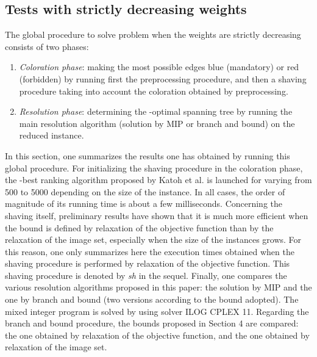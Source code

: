 \documentclass[final,3p,times]{elsarticle}
\begin{document}
\subsection{Tests with strictly decreasing weights}

The global procedure to solve problem  when the
weights are strictly decreasing consists of two phases: 
\begin{enumerate}
\item \emph{Coloration phase}: making the most possible edges blue (mandatory) or
  red (forbidden) by running first the preprocessing procedure, and then a shaving procedure taking into account the coloration obtained by preprocessing. 
\item \emph{Resolution phase}: determining the -optimal spanning
  tree by running the main resolution algorithm (solution by MIP or
  branch and bound) on the reduced instance.
\end{enumerate}

In this section, one summarizes the results one has obtained by
running this global procedure. For initializing the shaving procedure in the coloration phase, the -best ranking algorithm proposed by Katoh et al. \cite{KatIM81} is launched for  varying from 500 to 5000 depending on the size of the instance. In all cases, the order of magnitude of its running time is about a few milliseconds. Concerning the shaving itself, preliminary
results have shown that it is much more efficient
when the bound is defined by relaxation of the objective function than by the
relaxation of the image set, especially when the
size of the instances grows. For this reason, one only summarizes here
the execution times obtained when the shaving procedure is performed
by relaxation of the objective function. This shaving procedure is
denoted by \emph{sh} in the sequel. Finally, one compares the various
resolution algorithms proposed in this paper: the solution by MIP and the one by
branch and bound (two versions according to the bound adopted). The mixed integer program is solved by using solver ILOG CPLEX 11. Regarding the branch and bound procedure, the bounds proposed in Section 4 are compared: the one obtained by relaxation of the objective function, and the one obtained by relaxation of the image set. 
\end{document}
